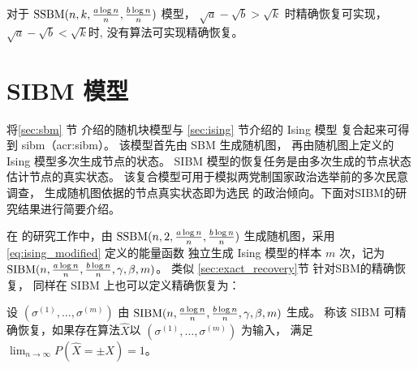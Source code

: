 \begin{theorem}\label{thm:sbmk_phase_transition}
  对于 $\operatorname{SSBM}(n,k,\frac{a \log n}{n}, \frac{b \log n}{n})$ 模型，
  $\sqrt{a} - \sqrt{b} > \sqrt{k}$ 时精确恢复可实现，
  $\sqrt{a} - \sqrt{b} < \sqrt{k}$时,
 没有算法可实现精确恢复。
\end{theorem}
\section{SIBM 模型}\label{sec:sibm_model}
将\ref{sec:sbm} 节 介绍的随机块模型与 \ref{sec:ising} 节介绍的 Ising 模型
复合起来可得到 \gls{sibm}（\gls{acr:sibm}）\cite{ye2020exact}。
该模型首先由 SBM 生成随机图，
再由随机图上定义的 Ising 模型多次生成节点的状态。
SIBM 模型的恢复任务是由多次生成的节点状态估计节点的真实状态。
该复合模型可用于模拟两党制国家政治选举前的多次民意调查，
生成随机图依据的节点真实状态即为选民
的政治倾向。下面对SIBM的研究结果进行简要介绍。

在\citet{ye2020exact} 的研究工作中，由 $\operatorname{SSBM}(n,2,\frac{a \log n}{n}, \frac{b \log n}{n})$
生成随机图，采用 \eqref{eq:ising_modified} 定义的能量函数
独立生成 Ising 模型的样本 $m$ 次，记为
$\operatorname{SIBM}(n, \frac{a \log n}{n}, \frac{b \log n}{n}, \gamma, \beta, m)$。
类似 \ref{sec:exact_recovery}节
针对SBM的精确恢复，
同样在 SIBM 上也可以定义精确恢复为：
\begin{definition}\label{def:sibm_exact_recovery}
  设 $(\sigma^{(1)}, \dots, \sigma^{(m)})$
  由 $\operatorname{SIBM}(n, \frac{a \log n}{n}, \frac{b \log n}{n}, \gamma, \beta, m)$ 生成。
  称该 SIBM 可精确恢复，如果存在算法$\hat{X}$以
  $(\sigma^{(1)}, \dots, \sigma^{(m)})$ 为输入，
  满足 $\lim_{n\to \infty}P(\hat{X}=\pm X) = 1$。 
\end{definition}

